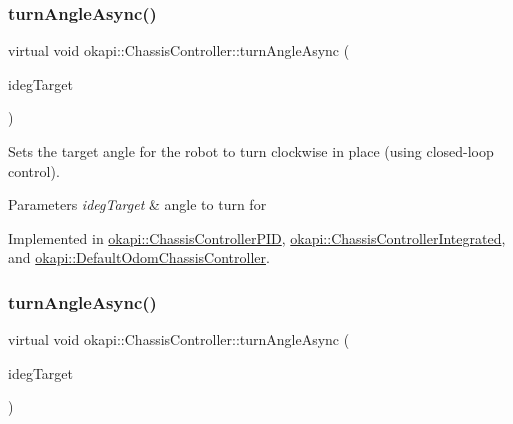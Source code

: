 \mbox{\label{classokapi_1_1ChassisController_a87fc1f88bf06340d8f022a8c185b5e87}} 
\subsubsection{\texorpdfstring{turnAngleAsync()}{turnAngleAsync()}\hspace{0.1cm}{\footnotesize\ttfamily [1/2]}}
{\footnotesize\ttfamily virtual void okapi\+::\+Chassis\+Controller\+::turn\+Angle\+Async (\begin{DoxyParamCaption}\item[{Q\+Angle}]{ideg\+Target }\end{DoxyParamCaption})\hspace{0.3cm}{\ttfamily [pure virtual]}}

Sets the target angle for the robot to turn clockwise in place (using closed-\/loop control).


\begin{DoxyParams}{Parameters}
{\em ideg\+Target} & angle to turn for \\
\hline
\end{DoxyParams}


Implemented in \mbox{\hyperlink{classokapi_1_1ChassisControllerPID_a391c12c7b3cb5461cd28c4aebc4aeab0}{okapi\+::\+Chassis\+Controller\+P\+ID}}, \mbox{\hyperlink{classokapi_1_1ChassisControllerIntegrated_a773a99fe7a1540da856ad6b6008ba24f}{okapi\+::\+Chassis\+Controller\+Integrated}}, and \mbox{\hyperlink{classokapi_1_1DefaultOdomChassisController_a18d748097a7938e3102638d17be54c76}{okapi\+::\+Default\+Odom\+Chassis\+Controller}}.

\mbox{\label{classokapi_1_1ChassisController_a35cadd99478629637b4bd3a5e709871a}} 
\subsubsection{\texorpdfstring{turnAngleAsync()}{turnAngleAsync()}\hspace{0.1cm}{\footnotesize\ttfamily [2/2]}}
{\footnotesize\ttfamily virtual void okapi\+::\+Chassis\+Controller\+::turn\+Angle\+Async (\begin{DoxyParamCaption}\item[{double}]{ideg\+Target }\end{DoxyParamCaption})\hspace{0.3cm}{\ttfamily [pure virtual]}}

